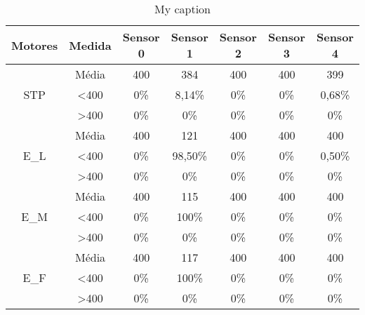 \begin{table}[]
\centering
\caption{My caption}
\label{my-label}
\begin{tabular}{|c|c|ccccc|}
\hline
\textbf{Motores}                & \textbf{Medida}  & \textbf{Sensor 0} & \textbf{Sensor 1} & \textbf{Sensor 2} & \textbf{Sensor 3} & \textbf{Sensor 4} \\ \hline
\multirow{3}{*}{STP}            & Média            & 400               & 384               & 400               & 400               & 399               \\
                                & \textless 400    & 0\%            & 8,14\%            & 0\%            & 0\%            & 0,68\%            \\
                                & \textgreater 400 & 0\%            & 0\%            & 0\%            & 0\%            & 0\%            \\ \hline
\multirow{3}{*}{E\_L}           & Média            & 400               & 121               & 400               & 400               & 400               \\
                                & \textless 400    & 0\%            & 98,50\%           & 0\%            & 0\%            & 0,50\%            \\
                                & \textgreater 400 & 0\%            & 0\%            & 0\%            & 0\%            & 0\%            \\ \hline
\multirow{3}{*}{E\_M}           & Média            & 400               & 115               & 400               & 400               & 400               \\
                                & \textless 400    & 0\%            & 100\%          & 0\%            & 0\%            & 0\%            \\
                                & \textgreater 400 & 0\%            & 0\%            & 0\%            & 0\%            & 0\%            \\ \hline
\multirow{3}{*}{E\_F}           & Média            & 400               & 117               & 400               & 400               & 400               \\
                                & \textless 400    & 0\%            & 100\%          & 0\%            & 0\%            & 0\%            \\
                                & \textgreater 400 & 0\%            & 0\%            & 0\%            & 0\%            & 0\%            \\ \hline

\end{tabular}
\end{table}
